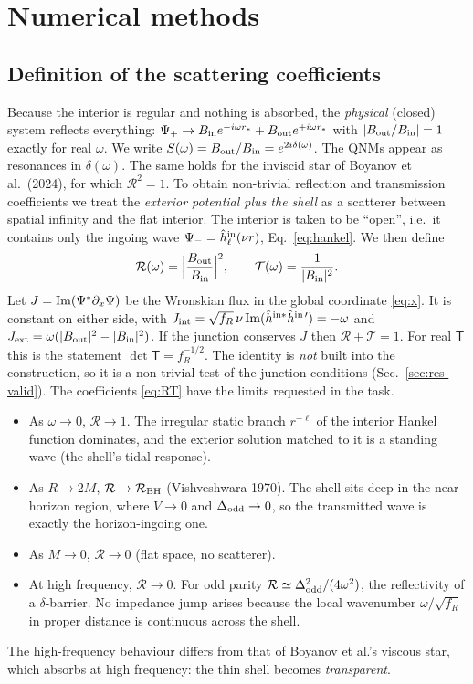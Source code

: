\documentclass[11pt,a4paper]{article}
\numberwithin{equation}{section}
\newcommand{\sq}{\sqrt{f_R}}
\begin{document}
\section{Numerical methods}\label{sec:num}

\subsection{Definition of the scattering coefficients}\label{sec:RTdef}
Because the interior is regular and nothing is absorbed, the \emph{physical} (closed) system reflects
everything: $\Psi_+\to B_{\rm in}e^{-i\omega r_*}+B_{\rm out}e^{+i\omega r_*}$ with $|B_{\rm out}/B_{\rm in}|=1$
exactly for real $\omega$. We write $S(\omega)=B_{\rm out}/B_{\rm in}=e^{2i\delta(\omega)}$. The QNMs appear
as resonances in $\delta(\omega)$. The same holds for the inviscid star of Boyanov et al.\ (2024), for which
$\mathcal R^2=1$. To obtain non-trivial reflection and transmission coefficients we treat the
\emph{exterior potential plus the shell} as a scatterer between spatial infinity and the flat interior. The
interior is taken to be ``open'', i.e.\ it contains only the ingoing wave
$\Psi_-=\hat h^{\rm in}_\ell(\nu r)$, Eq.~\eqref{eq:hankel}. We then define
\begin{equation}
\mathcal R(\omega)=\Big|\frac{B_{\rm out}}{B_{\rm in}}\Big|^2,\qquad \mathcal T(\omega)=\frac{1}{|B_{\rm in}|^2}.
\label{eq:RT}
\end{equation}
Let $J={\rm Im}(\Psi^*\partial_x\Psi)$ be the Wronskian flux in the global coordinate \eqref{eq:x}. It is
constant on either side, with $J_{\rm int}=\sq\,\nu\,{\rm Im}(\hat h^{\rm in*}\hat h^{\rm in\,\prime})=-\omega$ and
$J_{\rm ext}=\omega(|B_{\rm out}|^2-|B_{\rm in}|^2)$. If the junction conserves $J$ then
$\mathcal R+\mathcal T=1$. For real $\mathsf T$ this is the statement $\det\mathsf T=f_R^{-1/2}$. The
identity is \emph{not} built into the construction, so it is a non-trivial test of the junction conditions
(Sec.~\ref{sec:res-valid}). The coefficients \eqref{eq:RT} have the limits requested in the task.
\begin{itemize}
\item As $\omega\to0$, $\mathcal R\to1$. The irregular static branch $r^{-\ell}$ of the interior Hankel function
dominates, and the exterior solution matched to it is a standing wave (the shell's tidal response).
\item As $R\to2M$, $\mathcal R\to\mathcal R_{\rm BH}$ (Vishveshwara 1970). The shell sits deep in the
near-horizon region, where $V\to0$ and $\Delta_{\rm odd}\to0$, so the transmitted wave is exactly the
horizon-ingoing one.
\item As $M\to0$, $\mathcal R\to0$ (flat space, no scatterer).
\item At high frequency, $\mathcal R\to0$. For odd parity $\mathcal R\simeq\Delta_{\rm odd}^2/(4\omega^2)$, the
reflectivity of a $\delta$-barrier. No impedance jump arises because the local wavenumber $\omega/\sq$ in
proper distance is continuous across the shell.
\end{itemize}
The high-frequency behaviour differs from that of Boyanov et al.'s viscous star, which absorbs at high
frequency: the thin shell becomes \emph{transparent}.
\end{document}

